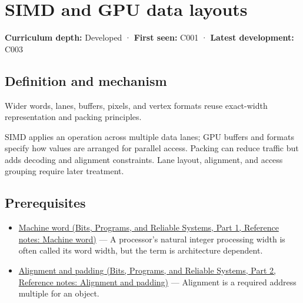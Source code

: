 \hypertarget{appendix-3c7b1a56de01}{}\label{referencestart:appendix-3c7b1a56de01}
\section{SIMD and GPU data layouts}\label{appendix-3c7b1a56de01-simd-and-gpu-data-layouts}

\hypertarget{appendix-3c7b1a56de01-simd-and-gpu-data-layouts}{}

\textbf{Curriculum depth:} Developed · \textbf{First seen:} C001 · \textbf{Latest development:} C003

\begin{allmightroledefinition}

\subsection{Definition and mechanism}\label{appendix-3c7b1a56de01-definition-and-mechanism}

\hypertarget{appendix-3c7b1a56de01-definition-and-mechanism}{}

Wider words, lanes, buffers, pixels, and vertex formats reuse exact-width representation and packing principles.

\end{allmightroledefinition}

SIMD applies an operation across multiple data lanes; GPU buffers and formats specify how values are arranged for parallel access. Packing can reduce traffic but adds decoding and alignment constraints. Lane layout, alignment, and access grouping require later treatment.

\subsection{Prerequisites}\label{appendix-3c7b1a56de01-prerequisites}

\hypertarget{appendix-3c7b1a56de01-prerequisites}{}

\begin{itemize}
\tightlist
\item
  \href{../01-Bits-Programs-and-Reliable-Systems-P01/main.pdf\#appendix-d67a19507dc5}{Machine word (Bits, Programs, and Reliable Systems, Part 1, Reference notes: Machine word)} --- A processor's natural integer processing width is often called its word width, but the term is architecture dependent.
\item
  \href{../01-Bits-Programs-and-Reliable-Systems-P02/main.pdf\#appendix-a1f7c53b4742}{Alignment and padding (Bits, Programs, and Reliable Systems, Part 2, Reference notes: Alignment and padding)} --- Alignment is a required address multiple for an object.
\end{itemize}

